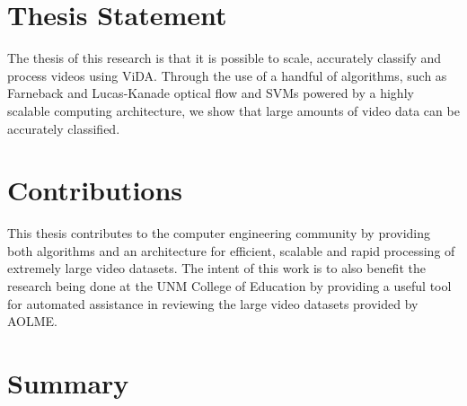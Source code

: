\section{\label{section:thesis_statement}Thesis Statement}
The thesis of this research is that it is possible to scale, accurately
classify and process videos using ViDA. Through the use of a handful of algorithms,
such as Farneback and Lucas-Kanade optical flow and SVMs powered by a highly scalable
computing architecture, we show that large amounts of video data can be
accurately classified.

\section{\label{section:contributions}Contributions}
This thesis contributes to the computer engineering community by providing both
algorithms and an architecture for efficient, scalable and rapid processing of
extremely large video datasets. The intent of this work is to also benefit
the research being done at the UNM College of Education by providing a useful
tool for automated assistance in reviewing the large video datasets provided
by AOLME.

\section{\label{section:summary}Summary}
